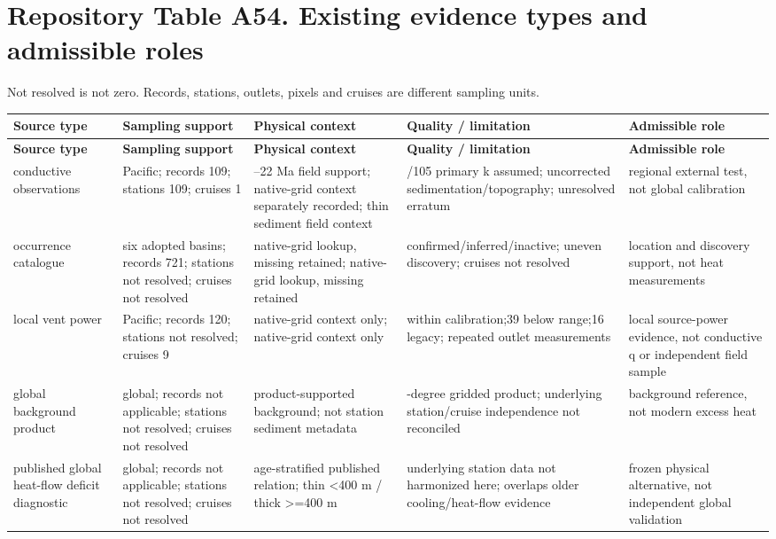 \documentclass[11pt,a4paper]{article}
\begin{document}
\section*{Repository Table A54. Existing evidence types and admissible roles}
Not resolved is not zero. Records, stations, outlets, pixels and cruises are different sampling units.\par
{\fontsize{8.3}{10.1}\selectfont\begin{longtable}{>{\raggedright\arraybackslash}p{31.883mm}>{\raggedright\arraybackslash}p{31.883mm}>{\raggedright\arraybackslash}p{31.883mm}>{\raggedright\arraybackslash}p{31.883mm}>{\raggedright\arraybackslash}p{31.883mm}}\toprule
\textbf{Source type} & \textbf{Sampling support} & \textbf{Physical context} & \textbf{Quality /\allowbreak{} limitation} & \textbf{Admissible role}\\\midrule\endfirsthead
\textbf{Source type} & \textbf{Sampling support} & \textbf{Physical context} & \textbf{Quality /\allowbreak{} limitation} & \textbf{Admissible role}\\\midrule\endhead
\bottomrule\endfoot
conductive observations & Pacific; records 109; stations 109; cruises 1 & 18--22 Ma field support; native-grid context separately recorded; thin sediment field context & 56/\allowbreak{}105 primary k assumed; uncorrected sedimentation/\allowbreak{}topography; unresolved erratum & regional external test, not global calibration\\
occurrence catalogue & six adopted basins; records 721; stations not resolved; cruises not resolved & native-grid lookup, missing retained; native-grid lookup, missing retained & confirmed/\allowbreak{}inferred/\allowbreak{}inactive; uneven discovery; cruises not resolved & location and discovery support, not heat measurements\\
local vent power & Pacific; records 120; stations not resolved; cruises 9 & native-grid context only; native-grid context only & 65 within calibration;39 below range;16 legacy; repeated outlet measurements & local source-power evidence, not conductive q or independent field sample\\
global background product & global; records not applicable; stations not resolved; cruises not resolved & product-supported background; not station sediment metadata & 2-degree gridded product; underlying station/\allowbreak{}cruise independence not reconciled & background reference, not modern excess heat\\
published global heat-flow deficit diagnostic & global; records not applicable; stations not resolved; cruises not resolved & age-stratified published relation; thin <400 m /\allowbreak{} thick >=400 m & underlying station data not harmonized here; overlaps older cooling/\allowbreak{}heat-flow evidence & frozen physical alternative, not independent global validation\\

\end{longtable}}
\end{document}
